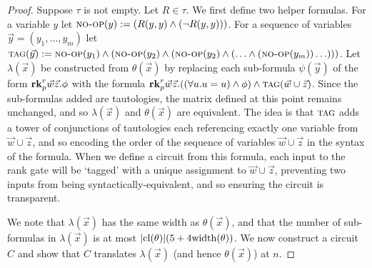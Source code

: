 \documentclass[../paper.tex]{subfiles}
\begin{document}
\begin{proof}
  Suppose $\tau$ is not empty. Let $R \in \tau$. We first define two helper
  formulas. For a variable $y$ let ${\normalfont\textsc{no-op}}(y) := (R(y, y) \land (\neg R(y,
  y)))$. For a sequence of variables $\vec{y} = (y_1, \ldots, y_m)$ let
  ${\normalfont\textsc{tag}} (\vec{y}) := {\normalfont\textsc{no-op}}(y_1) \land ({\normalfont\textsc{no-op}}(y_2) \land (
  {\normalfont\textsc{no-op}}(y_2) \land ( \ldots \land ({\normalfont\textsc{no-op}}(y_m)) \ldots)))$. Let
  $\lambda (\vec{x})$ be constructed from $\theta(\vec{x})$ by replacing each
  sub-formula $\psi(\vec{y})$ of the form $\text{\textbf{rk}}^r_p \vec{w} \vec{z} . \phi$
  with the formula $\text{\textbf{rk}}^r_p \vec{w}\vec{z} . ((\forall u . u = u) \land \phi)
  \land {\normalfont\textsc{tag}}(\vec{w} \cup \vec{z})$. Since the sub-formulas added are
  tautologies, the matrix defined at this point remains unchanged, and so
  $\lambda (\vec{x})$ and $\theta (\vec{x})$ are equivalent. The idea is that
  ${\normalfont\textsc{tag}}$ adds a tower of conjunctions of tautologies each referencing
  exactly one variable from $\vec{w} \cup \vec{z}$, and so encoding the order of
  the sequence of variables $\vec{w} \cup \vec{z}$ in the syntax of the formula.
  When we define a circuit from this formula, each input to the rank gate will
  be `tagged' with a unique assignment to $\vec{w} \cup \vec{z}$, preventing two
  inputs from being syntactically-equivalent, and so ensuring the circuit is
  transparent.




  We note that $\lambda(\vec{x})$ has the same width as $\theta(\vec{x})$, and
  that the number of sub-formulas in $\lambda(\vec{x})$ is at most $\vert
  \mathrm{cl}(\theta) \vert (5 + 4\mathrm{width}(\theta))$. We now construct a circuit $C$ and
  show that $C$ translates $\lambda(\vec{x})$ (and hence $\theta(\vec{x})$) at
  $n$.




\end{proof}
\end{document}
